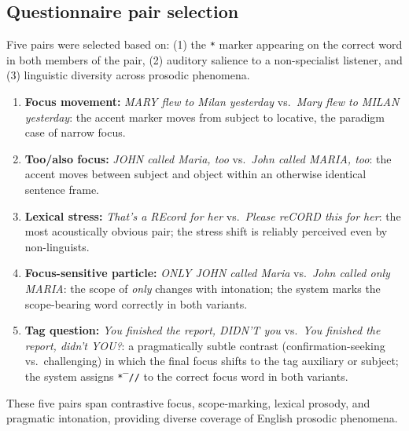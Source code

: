 \subsection{Questionnaire pair selection}

Five pairs were selected based on: (1) the \texttt{*} marker appearing on
the correct word in both members of the pair, (2) auditory salience to a
non-specialist listener, and (3) linguistic diversity across prosodic
phenomena.

\begin{enumerate}
\item \textbf{Focus movement:} \textit{MARY flew to Milan yesterday}
      vs.\ \textit{Mary flew to MILAN yesterday}: the accent marker moves
      from subject to locative, the paradigm case of narrow focus.
\item \textbf{Too/also focus:} \textit{JOHN called Maria, too}
      vs.\ \textit{John called MARIA, too}: the accent moves between
      subject and object within an otherwise identical sentence frame.
\item \textbf{Lexical stress:} \textit{That's a REcord for her}
      vs.\ \textit{Please reCORD this for her}: the most acoustically
      obvious pair; the stress shift is reliably perceived even by
      non-linguists.
\item \textbf{Focus-sensitive particle:} \textit{ONLY JOHN called Maria}
      vs.\ \textit{John called only MARIA}: the scope of \textit{only}
      changes with intonation; the system marks the scope-bearing word
      correctly in both variants.
\item \textbf{Tag question:} \textit{You finished the report, DIDN'T you}
      vs.\ \textit{You finished the report, didn't YOU?}: a pragmatically
      subtle contrast (confirmation-seeking vs.\ challenging) in which the
      final focus shifts to the tag auxiliary or subject; the system assigns
      \texttt{*‾//} to the correct focus word in both variants.
\end{enumerate}

These five pairs span contrastive focus, scope-marking, lexical prosody, and
pragmatic intonation, providing diverse coverage of English prosodic phenomena.

